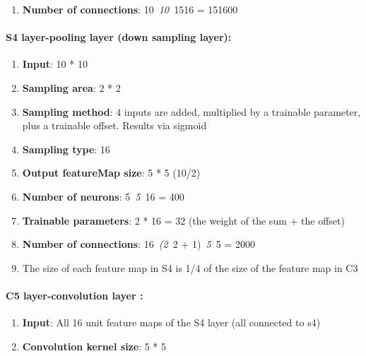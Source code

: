 \documentclass[10pt]{article} %
\begin{document}
\begin{spacing}{1.5}
\begin{enumerate}
\item  \textbf{Number of connections}: 10~\textit{10~}1516 = 151600
\end{enumerate}

\noindent 

\noindent 
\paragraph{S4 layer-pooling layer (down sampling layer):}

\begin{enumerate}
\item \textbf{ Input}: 10 * 10

\item  \textbf{Sampling area}: 2 * 2

\item  \textbf{Sampling method}: 4 inputs are added, multiplied by a trainable parameter, plus a trainable offset. Results via sigmoid

\item  \textbf{Sampling type}: 16

\item  \textbf{Output featureMap size}: 5 * 5 (10/2)

\item  \textbf{Number of neurons}: 5~\textit{5~}16 = 400

\item  \textbf{Trainable parameters}: 2 * 16 = 32 (the weight of the sum + the offset)

\item  \textbf{Number of connections}: 16~\textit{(2~}2 + 1)~\textit{5~}5 = 2000

\item  The size of each feature map in S4 is 1/4 of the size of the feature map in C3
\end{enumerate}

\noindent 

\noindent 
\paragraph{C5 layer-convolution layer :}

\begin{enumerate}
\item \textbf{ Input}: All 16 unit feature maps of the S4 layer (all connected to s4)

\item  \textbf{Convolution kernel size}: 5 * 5


\end{enumerate}
\end{spacing}
\end{document}
